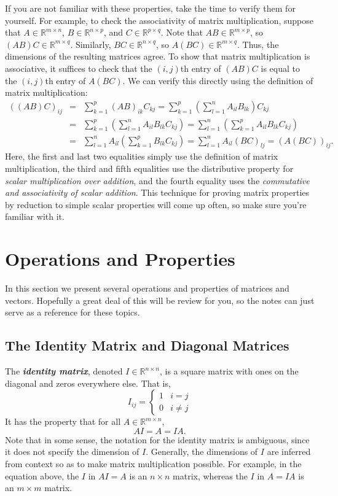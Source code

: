 \documentclass[12pt]{article}
\begin{document}
If you are not familiar with these properties, take the time to verify 
them for yourself.  For example, to check the associativity of matrix
multiplication, suppose that $A \in \mathbb{R}^{m \times n}$, 
$B \in \mathbb{R}^{n \times p}$, and $C \in \mathbb{R}^{p \times q}$.  
Note that $AB \in \mathbb{R}^{m \times p}$, so $(AB)C \in \mathbb{R}^{m \times q}$.
Similarly, $BC \in \mathbb{R}^{n \times q}$, so $A(BC) \in \mathbb{R}^{m \times q}$.
Thus, the dimensions of the resulting matrices agree.  To show that
matrix multiplication is associative, it suffices to check that the $(i,j)$th
entry of $(AB)C$ is equal to the $(i,j)$th entry of $A(BC)$.  We can verify 
this directly using the definition of matrix multiplication:
\begin{eqnarray*}
((AB)C)_{ij} &=& \sum_{k=1}^p (AB)_{ik}C_{kj} = \sum_{k=1}^p \left(\sum_{l=1}^n A_{il} B_{lk}\right) C_{kj} \\
&=& \sum_{k=1}^p \left(\sum_{l=1}^n A_{il} B_{lk} C_{kj} \right) = \sum_{l=1}^n \left(\sum_{k=1}^p A_{il} B_{lk} C_{kj} \right) \\
&=& \sum_{l=1}^n A_{il} \left(\sum_{k=1}^p B_{lk} C_{kj}\right) = \sum_{l=1}^n A_{il} (BC)_{lj} = (A(BC))_{ij}.
\end{eqnarray*}
Here, the first and last two equalities simply use the definition of matrix multiplication,
the third and fifth equalities use the distributive property for \textit{scalar multiplication over addition}, and
the fourth equality uses the \textit{commutative and associativity of scalar addition}.  This technique for proving
matrix properties by reduction to simple scalar properties will come up often, so make sure you're familiar with it.

\section{Operations and Properties}

In this section we present several operations and properties of
matrices and vectors. Hopefully a great deal of this will be review
for you, so the notes can just serve as a reference for these topics.

\subsection{The Identity Matrix and Diagonal Matrices}
The \textbf{\textit{identity matrix}}, denoted $I \in \mathbb{R}^{n
  \times n}$, is a square matrix with ones on the diagonal and zeros
  everywhere else.  That is,
\[ I_{ij} = \left \{ \begin{array}{ll}1 & i = j \\ 0 & i \neq j
  \end{array} \right . \]
It has the property that for all $A \in \mathbb{R}^{m \times n}$, \[AI
= A = IA.\]   Note that in some sense, the notation for the identity matrix
is ambiguous, since it does not specify the dimension of $I$.  Generally, 
the dimensions of $I$ are inferred from context so as to make matrix multiplication
possible.  For example, in the
equation above, the $I$ in $AI = A$ is an $n \times n$ matrix, whereas
the $I$ in $A = IA$ is an $m \times m$ matrix.
\end{document}

